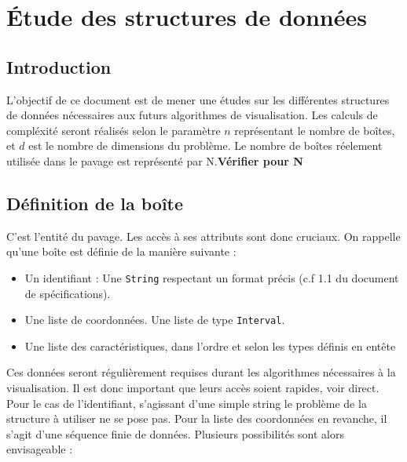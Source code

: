\chapter{Étude des structures de données}









\section{Introduction}
L'objectif de ce document est de mener une études sur les différentes structures de données nécessaires aux futurs algorithmes de visualisation. Les calculs de compléxité seront réalisés selon le paramètre $n$  représentant le nombre de boîtes, et $d$ est le nombre de dimensions du problème. Le nombre de boîtes réelement utilisée dans le pavage est représenté par N.\textbf{Vérifier pour N}


\section{Définition de la boîte}
C'est l'entité du pavage. Les accès à ses attributs sont donc cruciaux. On rappelle qu'une boîte est définie de la manière suivante : 
\begin{itemize}
 \item 
Un identifiant : Une \verb+String+ respectant un format précis (c.f 1.1 du document de spécifications).
\item
Une liste de coordonnées. Une liste de type \verb+Interval+.
\item
Une liste des caractéristiques, dans l'ordre et selon les types définis en entête
\end{itemize}
Ces données seront régulièrement requises durant les algorithmes nécessaires à la visualisation. Il est donc important que leurs accès soient rapides, voir direct. Pour le cas de l'identifiant, s'agissant d'une simple string le problème de la structure à utiliser ne se pose pas. Pour la liste des coordonnées en revanche, il s'agit d'une séquence finie de données. Plusieurs possibilités sont alors envisageable : 


